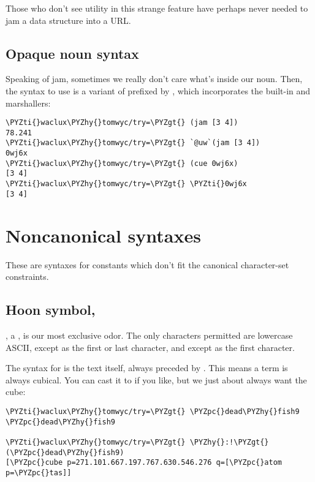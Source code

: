 Those who don't see utility in this strange feature have
perhaps never needed to jam a data structure into a URL.

\subsection{Opaque noun syntax}

Speaking of jam, sometimes we really don't care what's inside our
noun.  Then, the syntax to use is a variant of  prefixed by
\kode{\sig}, which incorporates the built-in  and  marshallers:

\begin{framed_shaded}
\begin{Verbatim}[fontsize=\relsize{-2.5},fontseries=b,commandchars=\\\{\}]
\PYZti{}waclux\PYZhy{}tomwyc/try=\PYZgt{} (jam [3 4])
78.241
\PYZti{}waclux\PYZhy{}tomwyc/try=\PYZgt{} `@uw`(jam [3 4])
0wj6x
\PYZti{}waclux\PYZhy{}tomwyc/try=\PYZgt{} (cue 0wj6x)
[3 4]
\PYZti{}waclux\PYZhy{}tomwyc/try=\PYZgt{} \PYZti{}0wj6x
[3 4]
\end{Verbatim}
\end{framed_shaded}

\section{Noncanonical syntaxes}

These are syntaxes for constants which don't fit the canonical
character-set constraints.

\subsection{Hoon symbol, }

, a , is our most exclusive odor.  The only
characters permitted are lowercase ASCII, \kode{-} except as the first
or last character, and  except as the first character.

The syntax for  is the text itself, always preceded by \kode{\%}.
This means a term is always cubical.  You can cast it to 
if you like, but we just about always want the cube:

\begin{framed_shaded}
\begin{Verbatim}[fontsize=\relsize{-2.5},fontseries=b,commandchars=\\\{\}]
\PYZti{}waclux\PYZhy{}tomwyc/try=\PYZgt{} \PYZpc{}dead\PYZhy{}fish9
\PYZpc{}dead\PYZhy{}fish9

\PYZti{}waclux\PYZhy{}tomwyc/try=\PYZgt{} \PYZhy{}:!\PYZgt{}(\PYZpc{}dead\PYZhy{}fish9)
[\PYZpc{}cube p=271.101.667.197.767.630.546.276 q=[\PYZpc{}atom p=\PYZpc{}tas]]
\end{Verbatim}
\end{framed_shaded}

